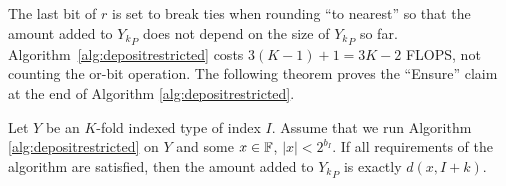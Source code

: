       The last bit of $r$ is set to break ties when rounding ``to nearest'' so
      that the amount added to ${Y_k}_P$ does not depend on the size of
      ${Y_k}_P$ so far.
      Algorithm~\ref{alg:depositrestricted} costs $3(K-1)+1=3K-2$ FLOPS,
      not counting the or-bit operation.
      The following theorem proves the ``Ensure'' claim at
      the end of Algorithm \ref{alg:depositrestricted}.

    \begin{samepage}
      \begin{lem}
        Let $Y$ be an $K$-fold indexed type of index $I$. Assume that we run
        Algorithm \ref{alg:depositrestricted} on $Y$ and some $x \in \mathbb{F}$, $|x|
        < 2^{b_I}$. If all requirements of the algorithm are satisfied, then
        the amount added to ${Y_k}_P$ is exactly $d(x, I + k)$.
        \label{lem:ddepositrestricted}
      \end{lem}
    \end{samepage}


